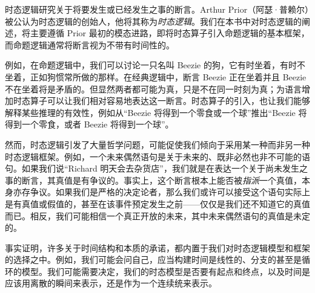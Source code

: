 \documentclass[../../../include/open-logic-section]{subfiles}
\begin{document}


时态逻辑研究关于将要发生或已经发生之事的断言。Arthur Prior（阿瑟·普赖尔）被公认为时态逻辑的创始人，他将其称为\emph{时态逻辑}。我们在本书中对时态逻辑的阐述，将主要遵循 Prior 最初的模态进路，即将时态算子引入命题逻辑的基本框架，而命题逻辑通常将断言视为不带有时间性的。

例如，在命题逻辑中，我们可以讨论一只名叫 Beezie 的狗，它有时坐着，有时不坐着，正如狗惯常所做的那样。在经典逻辑中，断言 Beezie 正在坐着并且 Beezie 不在坐着将是矛盾的。但显然两者都可能为真，只是不在同一时刻为真；为语言增加时态算子可以让我们相对容易地表达这一断言。时态算子的引入，也让我们能够解释某些推理的有效性，例如从“Beezie 将得到一个零食或一个球”推出“Beezie 将得到一个零食，或者 Beezie 将得到一个球”。

然而，时态逻辑引发了大量哲学问题，可能促使我们倾向于采用某一种而非另一种时态逻辑框架。例如，一个未来偶然语句是关于未来的、既非必然也非不可能的语句。如果我们说“Richard 明天会去杂货店”，我们就是在表达一个关于尚未发生之事的断言，其真值是有争议的。事实上，这个断言根本上能否被\emph{指派}一个真值，本身亦存争议。如果我们是严格的决定论者，那么我们或许可以接受这个语句实际上是有真值或假值的，甚至在该事件预定发生之前——仅仅是我们还不知道它的真值而已。相反，我们可能相信一个真正开放的未来，其中未来偶然语句的真值是未定的。

事实证明，许多关于时间结构和本质的承诺，都内置于我们对时态逻辑模型和框架的选择之中。例如，我们可能会问自己，应当构建时间是线性的、分支的甚至是循环的模型。我们可能需要决定，我们的时态模型是否要有起点和终点，以及时间是应该用离散的瞬间来表示，还是作为一个连续统来表示。
\end{document}
